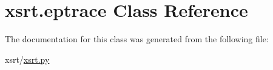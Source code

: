 \hypertarget{classxsrt_1_1eptrace}{}\section{xsrt.\+eptrace Class Reference}
\label{classxsrt_1_1eptrace}


The documentation for this class was generated from the following file\+:\begin{DoxyCompactItemize}
\item 
xsrt/\hyperlink{xsrt_8py}{xsrt.\+py}\end{DoxyCompactItemize}

